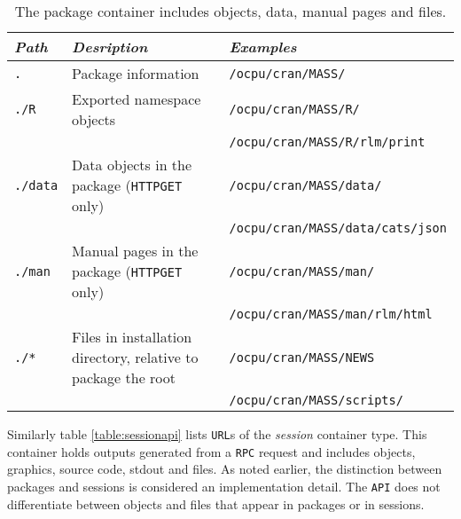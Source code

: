 \documentclass{article}
\newcommand{\GET}{\texttt{GET}\xspace}
\newcommand{\HTTP}{\texttt{HTTP}\xspace}
\newcommand{\API}{\texttt{API}\xspace}
\newcommand{\RPC}{\texttt{RPC}\xspace}
\begin{document}
\begin{table}[H]
\centering
\def\arraystretch{1.3}%
\begin{tabular}{@{}lll@{}}
\toprule
\emph{Path} & \emph{Desription}                      & \emph{Examples}                \\ \midrule
\texttt{.}    & Package information                      & \texttt{/ocpu/cran/MASS/}               \\
\texttt{./R}    & Exported namespace objects             & \texttt{/ocpu/cran/MASS/R/}             \\
     &                                                   & \texttt{/ocpu/cran/MASS/R/rlm/print}    \\
\texttt{./data} & Data objects in the package (\HTTP \GET only)         & \texttt{/ocpu/cran/MASS/data/}          \\
     &                                                   & \texttt{/ocpu/cran/MASS/data/cats/json} \\
\texttt{./man}  & Manual pages in the package (\HTTP \GET only)         & \texttt{/ocpu/cran/MASS/man/}           \\
     &                                                   & \texttt{/ocpu/cran/MASS/man/rlm/html}   \\
\texttt{./*}    & Files in installation directory, relative to package the root      & \texttt{/ocpu/cran/MASS/NEWS}    \\
     &                                                   & \texttt{/ocpu/cran/MASS/scripts/}       \\ \bottomrule
\end{tabular}
\caption{The package container includes objects, data, manual pages and files.}
\label{table:packageapi}
\end{table}

Similarly table \ref{table:sessionapi} lists \texttt{URL}s of the \emph{session} container type. This container holds outputs generated from a \RPC request and includes objects, graphics, source code, stdout and files. As noted earlier, the distinction between packages and sessions is considered an implementation detail. The \API does not differentiate between objects and files that appear in packages or in sessions.
\end{document}
